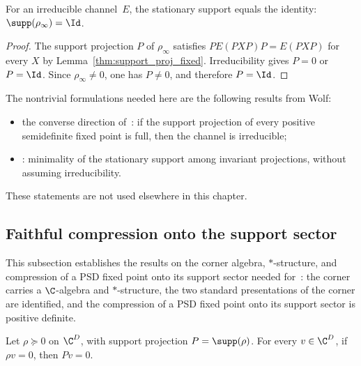 \begin{theorem}%
    \label{thm:stationarySupport_eq_one}
    \leanok
    For an irreducible channel~$E$, the stationary support equals the
    identity: $\supp(\rho_\infty)=\Id$.
\end{theorem}

\begin{proof}
    \leanok
    The support projection $P$ of $\rho_\infty$ satisfies
    $PE(PXP)P=E(PXP)$ for every $X$ by
    Lemma~\ref{thm:support_proj_fixed}. Irreducibility gives
    $P=0$ or $P=\Id$. Since $\rho_\infty\neq0$, one has $P\neq0$, and
    therefore $P=\Id$.
\end{proof}

\begin{remark}%
    \label{rem:stationary_support_todo}
    The nontrivial formulations needed here are the following results from
    Wolf:
    \begin{itemize}
        \item the converse direction
              of~\cite[Proposition~6.10]{Wolf2012Quantum}: if the support
              projection of every positive semidefinite fixed point is full,
              then the channel is irreducible;
        \item \cite[Proposition~6.11]{Wolf2012Quantum}: minimality of the
              stationary support among invariant projections, without
              assuming irreducibility.
    \end{itemize}
    These statements are not used elsewhere in this chapter.
\end{remark}

\subsection{Faithful compression onto the support sector}

This subsection establishes the results on the corner algebra,
$*$-structure, and compression of a PSD fixed point onto its support sector
needed for~\cite[Corollary~6.6]{Wolf2012Quantum}: the corner carries a
$\C$-algebra and $*$-structure, the two standard presentations of the corner
are identified, and the compression of a PSD fixed point onto its support
sector is positive definite.

\begin{lemma}%
    \label{lem:supportProj_mulVec_eq_zero_of_mulVec_eq_zero}
    \leanok
    Let $\rho\succeq0$ on $\C^D$, with support projection
    $P=\supp(\rho)$. For every $v\in\C^D$, if $\rho v=0$, then $Pv=0$.
\end{lemma}

